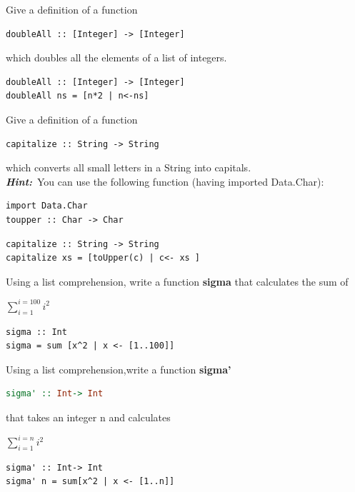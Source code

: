 \documentclass{article}
\begin{document}
\begin{Exercise}
Give a  definition of a function 
\begin{lstlisting}
doubleAll :: [Integer] -> [Integer]
\end{lstlisting}
which doubles all the elements of a list of integers. 
\end{Exercise}
\begin{Answer}
\begin{lstlisting}
doubleAll :: [Integer] -> [Integer]
doubleAll ns = [n*2 | n<-ns]
\end{lstlisting}
\end{Answer}
\begin{Exercise}
Give a  definition of a function 
\begin{lstlisting}
capitalize :: String -> String
\end{lstlisting}
which converts all small letters in a String into capitals.\\
\textbf{\textit{Hint:}}\ You can use the following function (having imported Data.Char):
\begin{lstlisting}
import Data.Char
toupper :: Char -> Char
\end{lstlisting}
\end{Exercise}
\begin{Answer}
\begin{lstlisting}
capitalize :: String -> String
capitalize xs = [toUpper(c) | c<- xs ]
\end{lstlisting}
\end{Answer}
\pagebreak
\begin{Exercise}
Using a list comprehension, write a function \textbf{sigma} that calculates the sum of 
\begin{center}
  $ \sum_{i=1}^{i=100} {i^2} $
\end{center}
\end{Exercise}
\begin{Answer}
\begin{lstlisting}
sigma :: Int
sigma = sum [x^2 | x <- [1..100]]
\end{lstlisting}
\end{Answer}
\begin{Exercise}
Using a list comprehension,write a function \textbf{sigma'}
\begin{lstlisting}[language=Haskell]
sigma' :: Int-> Int
\end{lstlisting}
that takes an integer n and calculates 
\begin{center}
  $ \sum_{i=1}^{i=n} {i^2} $
\end{center}
\end{Exercise}
\begin{Answer}
\begin{lstlisting}
sigma' :: Int-> Int
sigma' n = sum[x^2 | x <- [1..n]]
\end{lstlisting}
\end{Answer}
\end{document}
